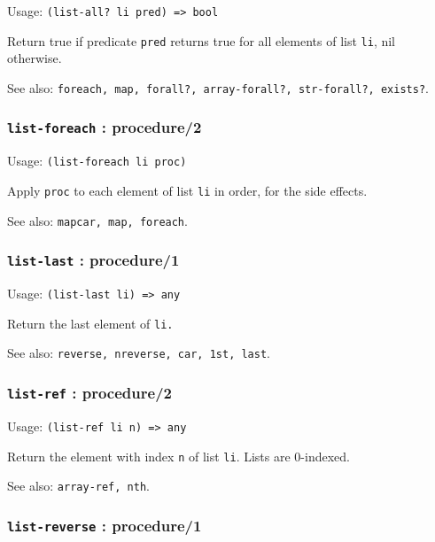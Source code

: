\documentclass[
]{article}
\newcommand{\passthrough}[1]{#1}
\begin{document}
Usage: \passthrough{\lstinline!(list-all? li pred) => bool!}

Return true if predicate \passthrough{\lstinline!pred!} returns true for
all elements of list \passthrough{\lstinline!li!}, nil otherwise.

See also:
\passthrough{\lstinline!foreach, map, forall?, array-forall?, str-forall?, exists?!}.

\hypertarget{list-foreach-procedure2}{%
\subsubsection{\texorpdfstring{\texttt{list-foreach} :
procedure/2}{list-foreach : procedure/2}}\label{list-foreach-procedure2}}

Usage: \passthrough{\lstinline!(list-foreach li proc)!}

Apply \passthrough{\lstinline!proc!} to each element of list
\passthrough{\lstinline!li!} in order, for the side effects.

See also: \passthrough{\lstinline!mapcar, map, foreach!}.

\hypertarget{list-last-procedure1}{%
\subsubsection{\texorpdfstring{\texttt{list-last} :
procedure/1}{list-last : procedure/1}}\label{list-last-procedure1}}

Usage: \passthrough{\lstinline!(list-last li) => any!}

Return the last element of \passthrough{\lstinline!li.!}

See also: \passthrough{\lstinline!reverse, nreverse, car, 1st, last!}.

\hypertarget{list-ref-procedure2}{%
\subsubsection{\texorpdfstring{\texttt{list-ref} :
procedure/2}{list-ref : procedure/2}}\label{list-ref-procedure2}}

Usage: \passthrough{\lstinline!(list-ref li n) => any!}

Return the element with index \passthrough{\lstinline!n!} of list
\passthrough{\lstinline!li!}. Lists are 0-indexed.

See also: \passthrough{\lstinline!array-ref, nth!}.

\hypertarget{list-reverse-procedure1}{%
\subsubsection{\texorpdfstring{\texttt{list-reverse} :
procedure/1}{list-reverse : procedure/1}}\label{list-reverse-procedure1}}
\end{document}
